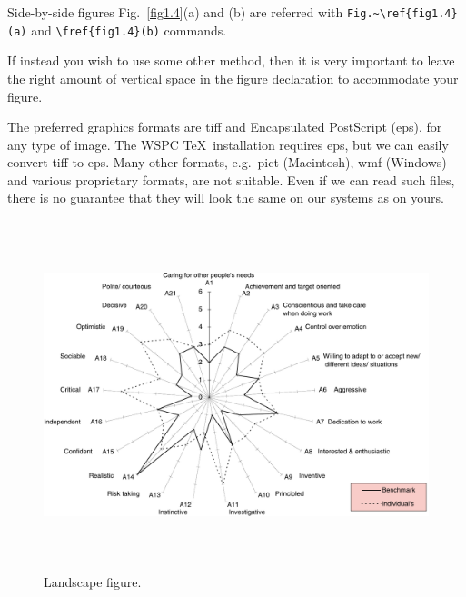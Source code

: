 Side-by-side figures Fig.~\ref{fig1.4}(a) and (b) are
referred with \verb|Fig.~\ref{fig1.4}(a)| and
\verb|\fref{fig1.4}(b)| commands.

If instead you wish to use some other method, then it is very
important to leave the right amount of vertical space in the figure
declaration to accommodate your figure.

The preferred graphics formats are tiff and Encapsulated PostScript
(eps), for any type of image. The WSPC \TeX\ installation requires
eps, but we can easily convert tiff to eps. Many other formats,
e.g.~pict (Macintosh), wmf (Windows) and various proprietary
formats, are not suitable. Even if we can read such files, there is
no guarantee that they will look the same on our systems as on
yours.

\begin{figure}
\begin{center}
\includegraphics[height=4in]{bk-fig5}
\end{center}
\caption{Landscape figure.}
\label{fig1.5}
\end{figure}

